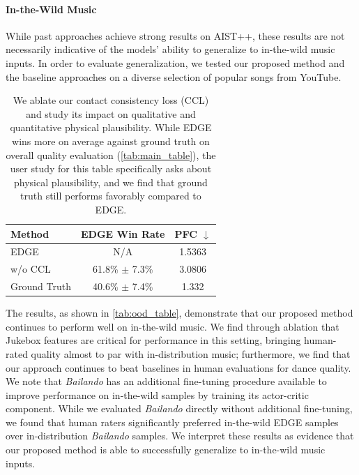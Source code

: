 \documentclass[10pt,twocolumn,letterpaper]{article}
\begin{document}
\paragraph{In-the-Wild Music}

While past approaches achieve strong results on AIST++, these results are not necessarily indicative of the models' ability to generalize to in-the-wild music inputs.
In order to evaluate generalization, we tested our proposed method and the baseline approaches on a diverse selection of popular songs from YouTube.

\begin{table}
  \centering
  \begin{tabular}{lcc}
    \toprule
    Method & EDGE Win Rate & PFC $\downarrow$ \\
    \midrule
    EDGE & N/A & 1.5363 \\
    \hspace{4pt} w/o CCL & 61.8\% $\pm$ 7.3\% & 3.0806 \\
    Ground Truth & 40.6\% $\pm$ 7.4\% & 1.332 \\
    \bottomrule
    \end{tabular}
    \caption{We ablate our contact consistency loss (CCL) and study its impact on qualitative and quantitative physical plausibility.
    While EDGE wins more on average against ground truth on overall quality evaluation (\cref{tab:main_table}), the user study for this table specifically asks about physical plausibility, and we find that ground truth still performs favorably compared to EDGE.}
    \label{tab:physical_plausibility_ablation}
\end{table}

The results, as shown in \cref{tab:ood_table}, demonstrate that our proposed method continues to perform well on in-the-wild music.
We find through ablation that Jukebox features are critical for performance in this setting, bringing human-rated quality almost to par with in-distribution music; furthermore, we find that our approach continues to beat baselines in human evaluations for dance quality.
We note that \emph{Bailando} has an additional fine-tuning procedure available to improve performance on in-the-wild samples by training its actor-critic component.
While we evaluated \emph{Bailando} directly without additional fine-tuning, we found that human raters significantly preferred in-the-wild EDGE samples over in-distribution \emph{Bailando} samples.
We interpret these results as evidence that our proposed method is able to successfully generalize to in-the-wild music inputs.
\end{document}
